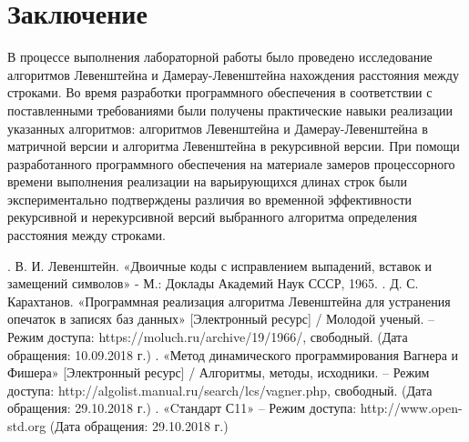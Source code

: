 \documentclass{article}
\begin{document}
\newpage
\section{Заключение}
\label{sec:finish}
В процессе выполнения лабораторной работы было проведено исследование алгоритмов Левенштейна и Дамерау-Левенштейна нахождения расстояния между строками. 
Во время разработки программного обеспечения в соответствии с поставленными требованиями были получены практические навыки реализации указанных алгоритмов: алгоритмов Левенштейна и Дамерау-Левенштейна в матричной версии и алгоритма Левенштейна в рекурсивной версии. 
При помощи разработанного программного обеспечения на материале замеров процессорного времени выполнения реализации на варьирующихся длинах строк были экспериментально подтверждены различия во временной эффективности рекурсивной и нерекурсивной версий выбранного алгоритма определения расстояния между строками. 

\newpage
\begin{thebibliography}{9}
	.	В. И. Левенштейн. «Двоичные коды с исправлением выпадений, вставок и замещений символов» - М.: Доклады Академий Наук СССР, 1965.
	.	Д. С. Карахтанов. «Программная реализация алгоритма Левенштейна для устранения опечаток в записях баз данных» [Электронный ресурс] / Молодой ученый. 	
                       – Режим доступа: https://moluch.ru/archive/19/1966/, свободный. (Дата обращения: 10.09.2018 г.)
	.	«Метод динамического программирования Вагнера и Фишера» [Электронный ресурс] / Алгоритмы, методы, исходники. – Режим доступа: http://algolist.manual.ru/search/lcs/vagner.php, свободный. 
        (Дата обращения: 29.10.2018 г.)
	. «Cтандарт С11»  – Режим доступа: http://www.open-std.org
        (Дата обращения: 29.10.2018 г.)
  
\end{thebibliography}
\end{document}
